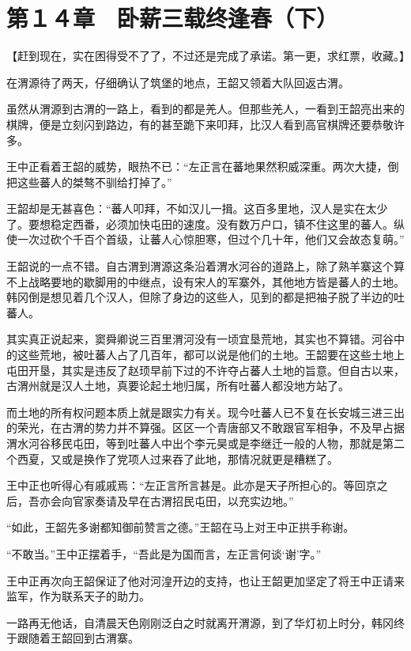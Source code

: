 \section{第１４章　卧薪三载终逢春（下）}

【赶到现在，实在困得受不了了，不过还是完成了承诺。第一更，求红票，收藏。】

在渭源待了两天，仔细确认了筑堡的地点，王韶又领着大队回返古渭。

虽然从渭源到古渭的一路上，看到的都是羌人。但那些羌人，一看到王韶亮出来的棋牌，便是立刻闪到路边，有的甚至跪下来叩拜，比汉人看到高官棋牌还要恭敬许多。

王中正看着王韶的威势，眼热不已：“左正言在蕃地果然积威深重。两次大捷，倒把这些蕃人的桀骜不驯给打掉了。”

王韶却是无甚喜色：“蕃人叩拜，不如汉儿一揖。这百多里地，汉人是实在太少了。要想稳定西番，必须加快屯田的速度。没有数万户口，镇不住这里的蕃人。纵使一次过砍个千百个首级，让蕃人心惊胆寒，但过个几十年，他们又会故态复萌。”

王韶说的一点不错。自古渭到渭源这条沿着渭水河谷的道路上，除了熟羊寨这个算不上战略要地的歇脚用的中继点，设有宋人的军寨外，其他地方皆是蕃人的土地。韩冈倒是想见着几个汉人，但除了身边的这些人，见到的都是把袖子脱了半边的吐蕃人。

其实真正说起来，窦舜卿说三百里渭河没有一顷宜垦荒地，其实也不算错。河谷中的这些荒地，被吐蕃人占了几百年，都可以说是他们的土地。王韶要在这些土地上屯田开垦，其实是违反了赵顼早前下过的不许夺占蕃人土地的旨意。但自古以来，古渭州就是汉人土地，真要论起土地归属，所有吐蕃人都没地方站了。

而土地的所有权问题本质上就是跟实力有关。现今吐蕃人已不复在长安城三进三出的荣光，在古渭的势力并不算强。区区一个青唐部又不敢跟官军相争，不及早占据渭水河谷移民屯田，等到吐蕃人中出个李元昊或是李继迁一般的人物，那就是第二个西夏，又或是换作了党项人过来吞了此地，那情况就更是糟糕了。

王中正也听得心有戚戚焉：“左正言所言甚是。此亦是天子所担心的。等回京之后，吾亦会向官家奏请及早在古渭招民屯田，以充实边地。”

“如此，王韶先多谢都知御前赞言之德。”王韶在马上对王中正拱手称谢。

“不敢当。”王中正摆着手，“吾此是为国而言，左正言何谈‘谢’字。”

王中正再次向王韶保证了他对河湟开边的支持，也让王韶更加坚定了将王中正请来监军，作为联系天子的助力。

一路再无他话，自清晨天色刚刚泛白之时就离开渭源，到了华灯初上时分，韩冈终于跟随着王韶回到古渭寨。

